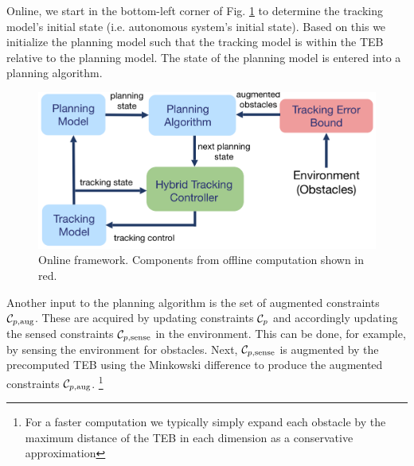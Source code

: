 Online, we start in the bottom-left corner of Fig. \ref{fig:fw_online} to determine the tracking model's initial state (i.e. autonomous system's initial state). Based on this we initialize the planning model such that the tracking model is within the TEB relative to the planning model. The state of the planning model is entered into a planning algorithm.  
\begin{figure}[h!]
	\centering
	\includegraphics[width=1\columnwidth]{fig/framework_online_2}
	\caption{Online framework. Components from offline computation shown in red.}
	\label{fig:fw_online}
\end{figure}
Another input to the planning algorithm is the set of augmented constraints $\mathcal C_{p,\text{aug}}$.  These are acquired by updating constraints $\mathcal C_p$ and accordingly updating the sensed constraints $\mathcal C_{p,\text{sense}}$ in the environment.  This can be done, for example, by sensing the environment for obstacles. Next, $\mathcal C_{p,\text{sense}}$ is augmented  by the precomputed TEB using the Minkowski difference to produce the augmented constraints $\mathcal C_{p,\text{aug}}$. \footnote{For a faster computation we typically simply expand each obstacle by the maximum distance of the TEB in each dimension as a conservative approximation}



